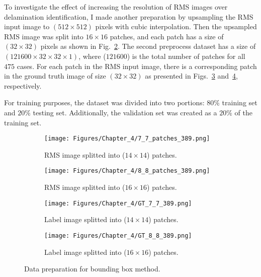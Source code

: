 To investigate the effect of increasing the resolution of RMS images over delamination identification, I made another preparation by upsampling the RMS input image to \((512\times 512)\) pixels with cubic interpolation. Then the upsampled RMS image was split into \(16\times 16\) patches, and each patch has a size of \((32\times 32)\) pixels as shown in Fig.~\ref{fig:RMS_64patches}.
The second preprocess dataset has a size of \((121600 \times 32 \times 32 \times 1)\), where (\(121600\)) is the total number of patches for all \(475\) cases.
For each patch in the RMS input image, there is a corresponding patch in the ground truth image of size \((32\times 32)\) as presented in Figs.~\ref{fig:GT_49patches} and~\ref{fig:GT_64patches}, respectively.

For training purposes, the dataset was divided into two portions: \(80\%\)	training set and \(20\%\) testing set. 
Additionally, the validation set was created as a \(20\%\) of the training set.
\begin{figure} [h!]
	\centering
	\begin{subfigure}[b]{0.47\textwidth}
		\centering
		\texttt{[image: Figures/Chapter\_4/7\_7\_patches\_389.png]}
		\caption{RMS image splitted into (\(14\times 14\)) patches.}
		\label{fig:RMS_49patches}
	\end{subfigure}
	\hfill
	\begin{subfigure}[b]{0.47\textwidth}
		\centering
		\texttt{[image: Figures/Chapter\_4/8\_8\_patches\_389.png]}
		\caption{RMS image splitted into (\(16\times 16\)) patches.}
		\label{fig:RMS_64patches}
	\end{subfigure}
	\hfill
	\begin{subfigure}[b]{0.47\textwidth}
		\centering
		\texttt{[image: Figures/Chapter\_4/GT\_7\_7\_389.png]}
		\caption{Label image splitted into (\(14\times 14\)) patches.}
		\label{fig:GT_49patches}
	\end{subfigure}
	\hfill
	\begin{subfigure}[b]{0.47\textwidth}
		\centering
		\texttt{[image: Figures/Chapter\_4/GT\_8\_8\_389.png]}
		\caption{Label image splitted into (\(16\times 16\)) patches.}
		\label{fig:GT_64patches}
	\end{subfigure}
	\caption{Data preparation for bounding box method.}
	\label{fig:grid_mesh}
\end{figure}

